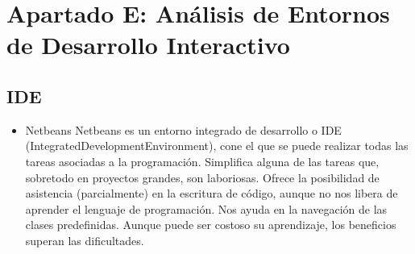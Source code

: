 	\chapter{Apartado E: An\'alisis de Entornos de Desarrollo Interactivo}
	
		
		\section{IDE}
		\begin{itemize}
			\item  Netbeans 
			\label{Herramientas}
			\newline
			Netbeans es un entorno integrado de desarrollo o IDE (IntegratedDevelopmentEnvironment), cone el que se puede realizar todas las tareas asociadas a la programación.
			\newline
			Simplifica alguna de las tareas que, sobretodo en proyectos grandes, son laboriosas. Ofrece la posibilidad de asistencia (parcialmente) en la escritura de código, aunque no nos libera de aprender el lenguaje de programación.
			Nos ayuda en la navegación de las clases predefinidas.
			Aunque puede ser costoso su aprendizaje, los beneficios superan las dificultades.
			

\end{itemize}
